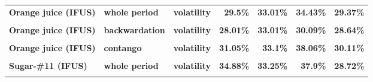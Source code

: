 \documentclass[
  authoryear,
  preprint,
  3p]{elsarticle}
\begin{document}
\begin{longtable}[t]{>{}l>{}l>{}l>{}r>{}r>{}r>{}r}
\textbf{Orange juice (IFUS)} & \textbf{whole period} & \textbf{volatility} & \textcolor[HTML]{4285f4}{\textbf{29.5\%}} & \textcolor[HTML]{4285f4}{\textbf{33.01\%}} & \textcolor[HTML]{4285f4}{\textbf{34.43\%}} & \textcolor[HTML]{4285f4}{\textbf{29.37\%}}\\
\addlinespace
\textbf{\cellcolor{gray!10}{Orange juice (IFUS)}} & \textbf{\cellcolor{gray!10}{backwardation}} & \textbf{\cellcolor{gray!10}{mean}} & \textcolor[HTML]{4285f4}{\textbf{\cellcolor{gray!10}{-2.38\%}}} & \textcolor[HTML]{4285f4}{\textbf{\cellcolor{gray!10}{-2.22\%}}} & \textcolor[HTML]{4285f4}{\textbf{\cellcolor{gray!10}{18.24\%}}} & \textcolor[HTML]{4285f4}{\textbf{\cellcolor{gray!10}{18.64\%}}}\\
\textbf{Orange juice (IFUS)} & \textbf{backwardation} & \textbf{volatility} & \textcolor[HTML]{4285f4}{\textbf{28.01\%}} & \textcolor[HTML]{4285f4}{\textbf{33.01\%}} & \textcolor[HTML]{4285f4}{\textbf{30.09\%}} & \textcolor[HTML]{4285f4}{\textbf{28.64\%}}\\
\textbf{\cellcolor{gray!10}{Orange juice (IFUS)}} & \textbf{\cellcolor{gray!10}{contango}} & \textbf{\cellcolor{gray!10}{mean}} & \textcolor[HTML]{4285f4}{\textbf{\cellcolor{gray!10}{5.83\%}}} & \textcolor[HTML]{4285f4}{\textbf{\cellcolor{gray!10}{29.93\%}}} & \textcolor[HTML]{4285f4}{\textbf{\cellcolor{gray!10}{12.29\%}}} & \textcolor[HTML]{4285f4}{\textbf{\cellcolor{gray!10}{-8.64\%}}}\\
\textbf{Orange juice (IFUS)} & \textbf{contango} & \textbf{volatility} & \textcolor[HTML]{4285f4}{\textbf{31.05\%}} & \textcolor[HTML]{4285f4}{\textbf{33.1\%}} & \textcolor[HTML]{4285f4}{\textbf{38.06\%}} & \textcolor[HTML]{4285f4}{\textbf{30.11\%}}\\
\textbf{\cellcolor{gray!10}{Sugar-\#11 (IFUS)}} & \textbf{\cellcolor{gray!10}{whole period}} & \textbf{\cellcolor{gray!10}{mean}} & \textcolor[HTML]{4285f4}{\textbf{\cellcolor{gray!10}{-4.56\%}}} & \textcolor[HTML]{4285f4}{\textbf{\cellcolor{gray!10}{24.87\%}}} & \textcolor[HTML]{4285f4}{\textbf{\cellcolor{gray!10}{11.82\%}}} & \textcolor[HTML]{4285f4}{\textbf{\cellcolor{gray!10}{-1.16\%}}}\\
\addlinespace
\textbf{Sugar-\#11 (IFUS)} & \textbf{whole period} & \textbf{volatility} & \textcolor[HTML]{4285f4}{\textbf{34.88\%}} & \textcolor[HTML]{4285f4}{\textbf{33.25\%}} & \textcolor[HTML]{4285f4}{\textbf{37.9\%}} & \textcolor[HTML]{4285f4}{\textbf{28.72\%}}\\
\textbf{\cellcolor{gray!10}{Sugar-\#11 (IFUS)}} & \textbf{\cellcolor{gray!10}{backwardation}} & \textbf{\cellcolor{gray!10}{mean}} & \textcolor[HTML]{4285f4}{\textbf{\cellcolor{gray!10}{11.98\%}}} & \textcolor[HTML]{4285f4}{\textbf{\cellcolor{gray!10}{29.51\%}}} & \textcolor[HTML]{4285f4}{\textbf{\cellcolor{gray!10}{2.7\%}}} & \textcolor[HTML]{4285f4}{\textbf{\cellcolor{gray!10}{-8.07\%}}}\\

\end{longtable}
\end{document}
